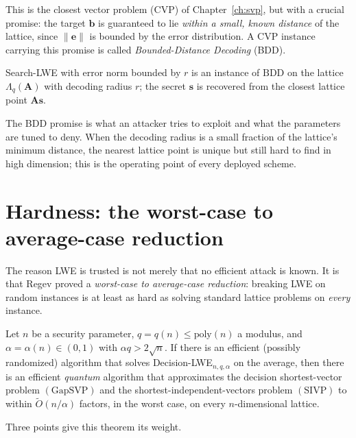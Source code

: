 This is the closest vector problem (CVP) of Chapter~\ref{ch:svp}, but with a crucial promise: the target $\mathbf{b}$ is guaranteed to lie \emph{within a small, known distance} of the lattice, since $\|\mathbf{e}\|$ is bounded by the error distribution. A CVP instance carrying this promise is called \emph{Bounded-Distance Decoding} (BDD).

\begin{proposition}
Search-LWE with error norm bounded by $r$ is an instance of $\mathrm{BDD}$ on the lattice $\Lambda_q(\mathbf{A})$ with decoding radius $r$; the secret $\mathbf{s}$ is recovered from the closest lattice point $\mathbf{A}\mathbf{s}$.
\end{proposition}

The BDD promise is what an attacker tries to exploit and what the parameters are tuned to deny. When the decoding radius is a small fraction of the lattice's minimum distance, the nearest lattice point is unique but still hard to find in high dimension; this is the operating point of every deployed scheme.

\section{Hardness: the worst-case to average-case reduction}

The reason LWE is trusted is not merely that no efficient attack is known. It is that Regev proved a \emph{worst-case to average-case reduction}: breaking LWE on random instances is at least as hard as solving standard lattice problems on \emph{every} instance.

\begin{theorem}
\label{thm:regev}
Let $n$ be a security parameter, $q=q(n)\le\mathrm{poly}(n)$ a modulus, and $\alpha=\alpha(n)\in(0,1)$ with $\alpha q>2\sqrt{n}$. If there is an efficient (possibly randomized) algorithm that solves Decision-LWE$_{n,q,\alpha}$ on the average, then there is an efficient \emph{quantum} algorithm that approximates the decision shortest-vector problem $(\mathrm{GapSVP})$ and the shortest-independent-vectors problem $(\mathrm{SIVP})$ to within $\widetilde{O}(n/\alpha)$ factors, in the worst case, on every $n$-dimensional lattice.
\end{theorem}

Three points give this theorem its weight.


